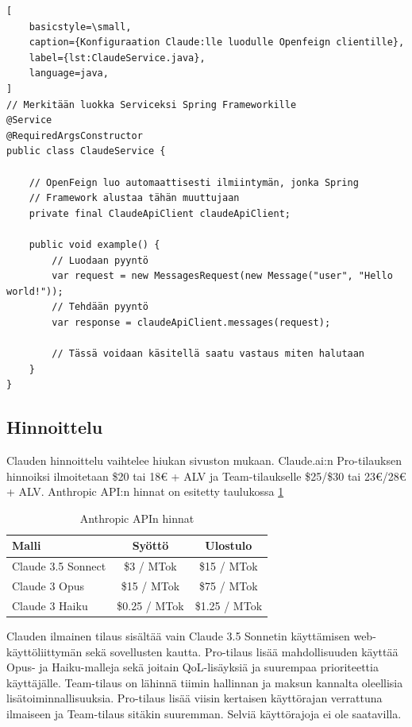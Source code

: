 \begin{lstlisting}[
    basicstyle=\small,
    caption={Konfiguraation Claude:lle luodulle Openfeign clientille},
    label={lst:ClaudeService.java},
    language=java,
]
// Merkitään luokka Serviceksi Spring Frameworkille
@Service
@RequiredArgsConstructor
public class ClaudeService {

    // OpenFeign luo automaattisesti ilmiintymän, jonka Spring
    // Framework alustaa tähän muuttujaan
    private final ClaudeApiClient claudeApiClient;

    public void example() {
        // Luodaan pyyntö
        var request = new MessagesRequest(new Message("user", "Hello world!"));
        // Tehdään pyyntö
        var response = claudeApiClient.messages(request);

        // Tässä voidaan käsitellä saatu vastaus miten halutaan
    }
}
\end{lstlisting}

\subsection{Hinnoittelu}

Clauden hinnoittelu vaihtelee hiukan sivuston mukaan. Claude.ai:n Pro-tilauksen
hinnoiksi ilmoitetaan \$20 tai 18€ + ALV ja Team-tilaukselle \$25/\$30 tai
23€/28€ + ALV. \parencite{anthropicPricing} \parencite{claudePricing} Anthropic
API:n hinnat on esitetty taulukossa \ref{tab:anthropic-api-pricing}

\begin{table}[H]
  \centering
  \caption{Anthropic APIn hinnat}
  \label{tab:anthropic-api-pricing}
  \begin{tabular}{lcc}
    \textbf{Malli} & \textbf{Syöttö} & \textbf{Ulostulo} \\
    \hline
    Claude 3.5 Sonnect &    \$3 / MTok &   \$15 / MTok \\
    Claude 3 Opus      &   \$15 / MTok &   \$75 / MTok \\
    Claude 3 Haiku     & \$0.25 / MTok & \$1.25 / MTok \\
    \hline
  \end{tabular}
\end{table}

Clauden ilmainen tilaus sisältää vain Claude 3.5 Sonnetin käyttämisen web-
käyttöliittymän sekä sovellusten kautta. Pro-tilaus lisää mahdollisuuden
käyttää Opus- ja Haiku-malleja sekä joitain QoL-lisäyksiä ja suurempaa
prioriteettia käyttäjälle. Team-tilaus on lähinnä tiimin hallinnan ja maksun
kannalta oleellisia lisätoiminnallisuuksia. Pro-tilaus lisää viisin kertaisen
käyttörajan verrattuna ilmaiseen ja Team-tilaus sitäkin suuremman.
\parencite{anthropicPricing} \parencite{claudePricing} Selviä käyttörajoja ei
ole saatavilla.
